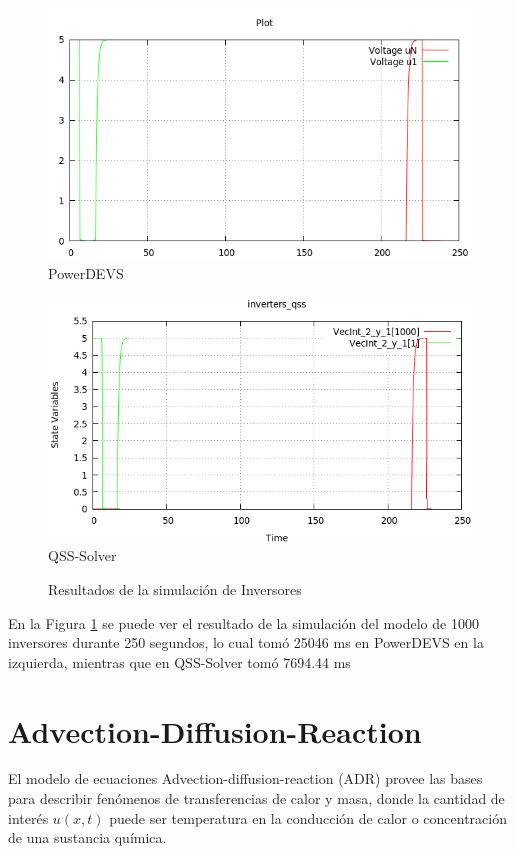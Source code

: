 \begin{figure}[H]
\centering
\begin{minipage}{0.5\textwidth}
 \includegraphics[width=\linewidth]{inversers-pd}
\centering
PowerDEVS
\end{minipage}\hfill
\begin{minipage}{0.5\textwidth}
 \includegraphics[width=\linewidth]{inversers-qss}
\centering
QSS-Solver
\end{minipage}
\caption{Resultados de la simulación de Inversores}\label{graph:inverters}
\end{figure}

En la Figura \ref{graph:inverters} se puede ver el resultado de la simulación del modelo de 1000 inversores durante 250 segundos, lo cual tomó 25046 ms en PowerDEVS en 
	la izquierda, mientras que en QSS-Solver tomó 7694.44 ms	

\section{Advection-Diffusion-Reaction}
	El modelo de ecuaciones Advection-diffusion-reaction (ADR) provee las bases para describir fenómenos de transferencias de calor y masa, donde la cantidad de interés $u(x,t)$ puede ser temperatura en la conducción de calor o concentración de una sustancia química.

